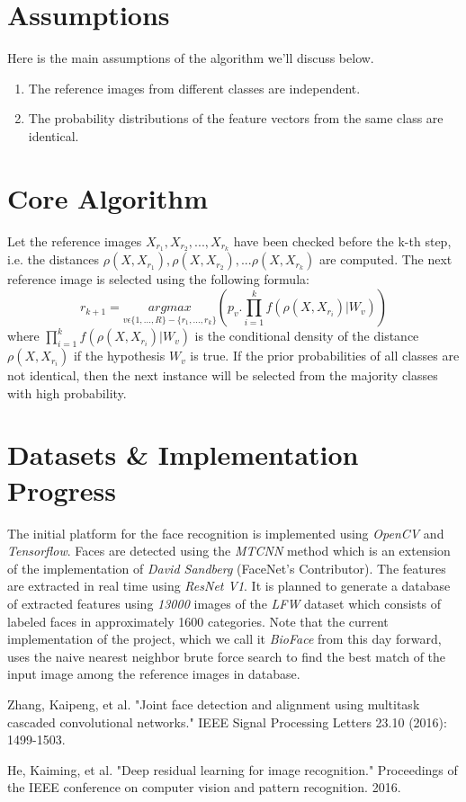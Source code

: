 \documentclass[journal, a4paper]{IEEEtran}
\begin{document}
\section{Assumptions}
Here is the main assumptions of the algorithm we'll discuss below.
\begin{enumerate}
	\item The reference images from different
	classes are independent.
	
	\item The probability distributions of the
	feature vectors from the same class are identical.
\end{enumerate}
\section{Core Algorithm} 
Let the reference images $X_{r_1}, X_{r_2}, ..., X_{r_k}$ have been checked before the k-th step, i.e. the distances $\rho(X, X_{r_1}), \rho(X, X_{r_2}), ... \rho(X, X_{r_k})$ are computed. The next reference image is selected using the following formula:
$$
	r_{k+1} = \underset{v \epsilon \{1, ..., R\} - \{r_1, ..., r_k\}}{argmax}(p_v. \prod_{i = 1}^{k} f(\rho(X, X_{r_i}) | W_v))
$$
where $\prod_{i = 1}^{k} f(\rho(X, X_{r_i}) | W_v)$ is the conditional density of the distance $\rho(X, X_{r_i})$ if the hypothesis $W_v$ is true. If the prior probabilities of all classes are not identical, then the next instance will be selected from the majority classes with high probability. 

\section{Datasets \& Implementation Progress}
The initial platform for the face recognition is implemented using \textit{OpenCV} and \textit{Tensorflow}. Faces are detected using the \textit{MTCNN}\cite{HOP96} method which is an extension of the implementation of \textit{David Sandberg} (FaceNet's Contributor). The features are extracted in real time using \textit{ResNet V1}\cite{HOP97}. It is planned to generate a database of extracted features using \textit{13000} images of the \textit{LFW} dataset which consists of labeled faces in approximately 1600 categories. Note that the current implementation of the project, which we call it \textit{BioFace} from this day forward, uses the naive nearest neighbor brute force search to find the best match of the input image among the reference images in database.
\begin{thebibliography}{5}
	
	Zhang, Kaipeng, et al. "Joint face detection and alignment using multitask cascaded convolutional networks." IEEE Signal Processing Letters 23.10 (2016): 1499-1503.

	He, Kaiming, et al. "Deep residual learning for image recognition." Proceedings of the IEEE conference on computer vision and pattern recognition. 2016.
\end{thebibliography}


\end{document}
